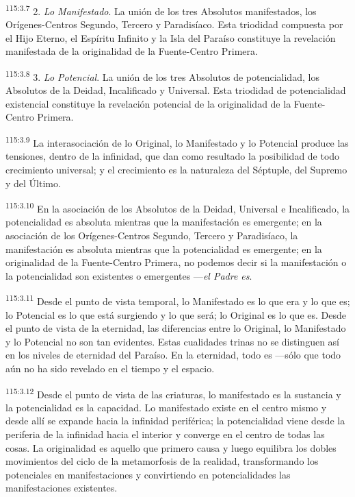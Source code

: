 \documentclass[twoside, 11pt]{book}
\begin{document}
\par
\textsuperscript{115:3.7} 2. \textit{Lo Manifestado}. La unión de los tres Absolutos manifestados, los Orígenes-Centros Segundo, Tercero y Paradisíaco. Esta triodidad compuesta por el Hijo Eterno, el Espíritu Infinito y la Isla del Paraíso constituye la revelación manifestada de la originalidad de la Fuente-Centro Primera.

\par
\textsuperscript{115:3.8} 3. \textit{Lo Potencial}. La unión de los tres Absolutos de potencialidad, los Absolutos de la Deidad, Incalificado y Universal. Esta triodidad de potencialidad existencial constituye la revelación potencial de la originalidad de la Fuente-Centro Primera.

\par
\textsuperscript{115:3.9} La interasociación de lo Original, lo Manifestado y lo Potencial produce las tensiones, dentro de la infinidad, que dan como resultado la posibilidad de todo crecimiento universal; y el crecimiento es la naturaleza del Séptuple, del Supremo y del Último.

\par
\textsuperscript{115:3.10} En la asociación de los Absolutos de la Deidad, Universal e Incalificado, la potencialidad es absoluta mientras que la manifestación es emergente; en la asociación de los Orígenes-Centros Segundo, Tercero y Paradisíaco, la manifestación es absoluta mientras que la potencialidad es emergente; en la originalidad de la Fuente-Centro Primera, no podemos decir si la manifestación o la potencialidad son existentes o emergentes ---\textit{el Padre es}.

\par
\textsuperscript{115:3.11} Desde el punto de vista temporal, lo Manifestado es lo que era y lo que es; lo Potencial es lo que está surgiendo y lo que será; lo Original es lo que es. Desde el punto de vista de la eternidad, las diferencias entre lo Original, lo Manifestado y lo Potencial no son tan evidentes. Estas cualidades trinas no se distinguen así en los niveles de eternidad del Paraíso. En la eternidad, todo es ---sólo que todo aún no ha sido revelado en el tiempo y el espacio.

\par
\textsuperscript{115:3.12} Desde el punto de vista de las criaturas, lo manifestado es la sustancia y la potencialidad es la capacidad. Lo manifestado existe en el centro mismo y desde allí se expande hacia la infinidad periférica; la potencialidad viene desde la periferia de la infinidad hacia el interior y converge en el centro de todas las cosas. La originalidad es aquello que primero causa y luego equilibra los dobles movimientos del ciclo de la metamorfosis de la realidad, transformando los potenciales en manifestaciones y convirtiendo en potencialidades las manifestaciones existentes.
\end{document}
